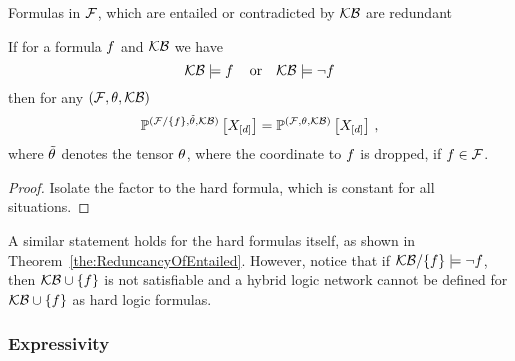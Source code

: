 


Formulas in $\mathcal{F}$, which are entailed or contradicted by $\mathcal{KB}$ are redundant 

\begin{theorem}
	If for a formula $f$ and $\mathcal{KB}$ we have  %
		\[ \mathcal{KB} \models f \, \quad \text{or} \quad \mathcal{KB} \models \lnot f \]
	then for any $(\mathcal{F},\theta,\mathcal{KB})$
		\[ \mathbb{P}^{(\mathcal{F}/\{f\},\tilde{\theta},\mathcal{KB})}\left[X_{[d]}\right] =  \mathbb{P}^{(\mathcal{F},\theta,\mathcal{KB})}\left[X_{[d]}\right]  \, , \]
	where $\tilde{\theta}$ denotes the tensor $\theta$, where the coordinate to $f$ is dropped, if $f\in\mathcal{F}$.
\end{theorem}
\begin{proof}
	Isolate the factor to the hard formula, which is constant for all situations.
\end{proof}

A similar statement holds for the hard formulas itself, as shown in Theorem~\ref{the:ReduncancyOfEntailed}.
However, notice that if $\mathcal{KB}/\{f\}\models\lnot f$, then $\mathcal{KB}\cup\{f\}$ is not satisfiable and a hybrid logic network cannot be defined for $\mathcal{KB}\cup\{f\}$ as hard logic formulas.




\subsubsection{Expressivity}

